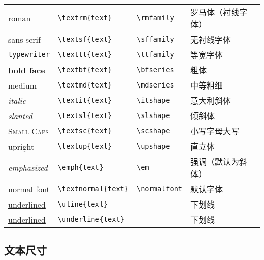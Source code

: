 \documentclass{ctexbook}
\begin{document}
\begin{table}[h!]
	\centering
	\begin{tabular}{l l l l}
		\hline
		\textrm{roman}           & \verb|\textrm{|{\color{gray}\verb|text|}\verb|}|     & \verb|\rmfamily|   & 罗马体（衬线字体） \\
		\textsf{sans serif}      & \verb|\textsf{|{\color{gray}\verb|text|}\verb|}|     & \verb|\sffamily|   & 无衬线字体 \\
		\texttt{typewriter}      & \verb|\texttt{|{\color{gray}\verb|text|}\verb|}|     & \verb|\ttfamily|   & 等宽字体 \\
		\hline
		\textbf{bold face}       & \verb|\textbf{|{\color{gray}\verb|text|}\verb|}|     & \verb|\bfseries|   & 粗体 \\
		\textmd{medium}          & \verb|\textmd{|{\color{gray}\verb|text|}\verb|}|     & \verb|\mdseries|   & 中等粗细 \\
		\hline
		\textit{italic}          & \verb|\textit{|{\color{gray}\verb|text|}\verb|}|     & \verb|\itshape|    & 意大利斜体 \\
		\textsl{slanted}         & \verb|\textsl{|{\color{gray}\verb|text|}\verb|}|     & \verb|\slshape|    & 倾斜体 \\
		\textsc{Small Caps}      & \verb|\textsc{|{\color{gray}\verb|text|}\verb|}|     & \verb|\scshape|    & 小写字母大写 \\
		\textup{upright}         & \verb|\textup{|{\color{gray}\verb|text|}\verb|}|     & \verb|\upshape|    & 直立体 \\
		\hline
		\emph{emphasized}        & \verb|\emph{|{\color{gray}\verb|text|}\verb|}|       & \verb|\em|         & 强调（默认为斜体） \\
		\textnormal{normal font} & \verb|\textnormal{|{\color{gray}\verb|text|}\verb|}| & \verb|\normalfont| & 默认字体 \\
		\uline{underlined}       & \verb|\uline{|{\color{gray}\verb|text|}\verb|}|      &                    & 下划线 \\
		\underline{underlined}   & \verb|\underline{|{\color{gray}\verb|text|}\verb|}|  &                    & 下划线 \\
		\hline
	\end{tabular}
\end{table}

\subsection{文本尺寸}
\end{document}
